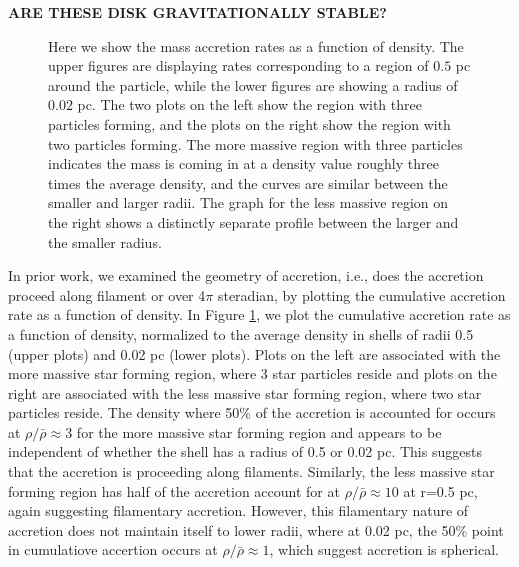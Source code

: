 \documentclass{emulateapj}
\begin{document}
{\bf ARE THESE DISK GRAVITATIONALLY STABLE?}


\begin{figure}
\caption{Here we show the mass accretion rates as a function of density.  The upper figures are displaying rates corresponding to a region of $0.5$ pc around the particle, while the lower figures are showing a radius of $0.02$ pc.  The two plots on the left show the region with three particles forming, and the plots on the right show the region with two particles forming.  The more massive region with three particles indicates the mass is coming in at a density value roughly three times the average density, and the curves are similar between the smaller and larger radii.  The graph for the less massive region on the right shows a distinctly separate profile between the larger and the smaller radius.   \label{fig:accretion average rho}}
\end{figure}

In prior work, we examined the geometry of accretion, i.e., does the accretion proceed along filament or over 4$\pi$ steradian, by plotting the cumulative accretion rate as a function of density. In Figure \ref{fig:accretion average rho}, we plot the cumulative accretion rate as a function of density, normalized to the average density in shells of radii 0.5 (upper plots) and 0.02 pc (lower plots).  Plots on the left are associated with the more massive star forming region, where 3 star particles reside and plots on the right are associated with the less massive star forming region, where two star particles reside.  The density where 50\% of the accretion is accounted for occurs at $\rho/\bar{\rho} \approx 3$ for the more massive star forming region and appears to be independent of whether the shell has a radius of 0.5 or 0.02 pc.  This suggests that the accretion is proceeding along filaments.  Similarly, the less massive star forming region has half of the accretion account for at $\rho/\bar{\rho} \approx 10$ at r=0.5 pc, again suggesting filamentary accretion.  However, this filamentary nature of accretion does not maintain itself to lower radii, where at 0.02 pc, the 50\% point in cumulatiove accertion occurs at $\rho/\bar{\rho} \approx 1$, which suggest accretion is spherical.
\end{document}
